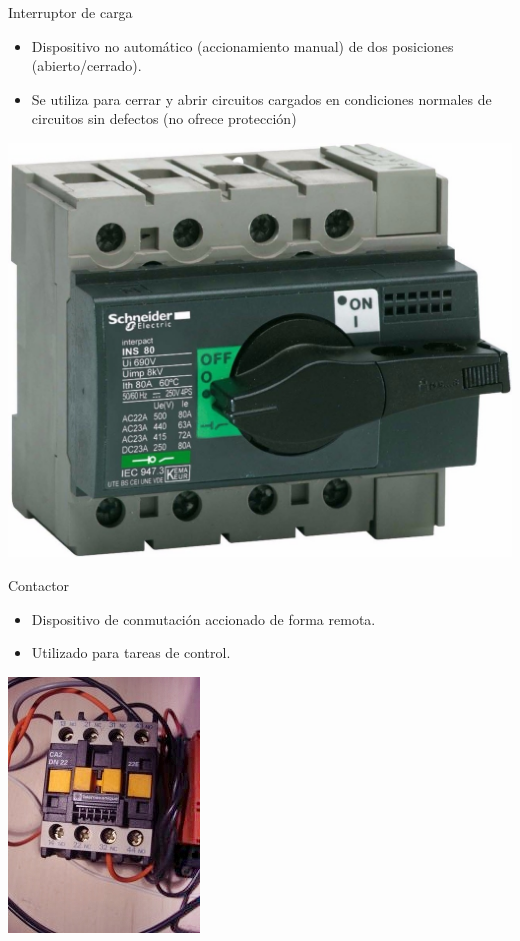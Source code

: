 \documentclass[xcolor={usenames,svgnames,dvipsnames}]{beamer}
\begin{document}
\begin{frame}[label={sec:orga7181c7}]{Interruptor de carga}
\begin{itemize}
\item Dispositivo no automático (\alert{accionamiento manual}) de dos posiciones (abierto/cerrado).

\item Se utiliza para cerrar y abrir circuitos cargados en condiciones normales de circuitos sin defectos (\alert{no ofrece protección})
\end{itemize}
\begin{center}
\includegraphics[height=0.6\textheight]{../figs/interruptor_manual.jpg}
\end{center}
\end{frame}


\begin{frame}[label={sec:orgceeb356}]{Contactor}
\begin{itemize}
\item Dispositivo de conmutación accionado de forma remota.
\item Utilizado para tareas de control.
\end{itemize}

\begin{center}
\includegraphics[height=0.6\textheight]{../figs/Contactor.jpg}
\end{center}
\end{frame}
\end{document}
